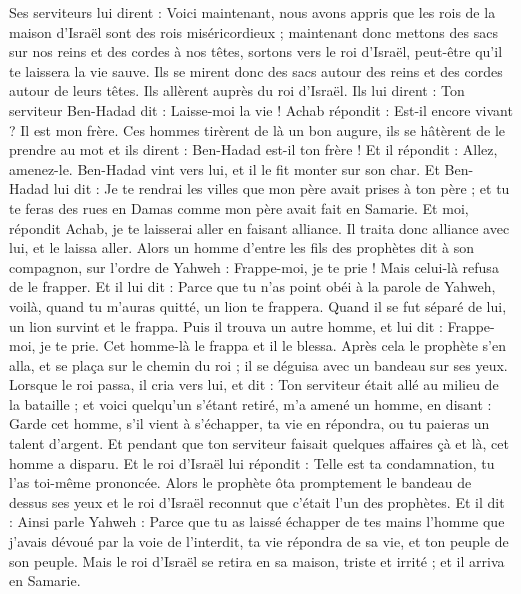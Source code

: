 \begin{multicols}{2}
Ses serviteurs lui dirent : Voici maintenant, nous avons appris que les rois de la maison d'Israël sont des rois miséricordieux ; maintenant donc mettons des sacs sur nos reins et des cordes à nos têtes, sortons vers le roi d'Israël, peut-être qu'il te laissera la vie sauve.
Ils se mirent donc des sacs autour des reins et des cordes autour de leurs têtes. Ils allèrent auprès du roi d'Israël. Ils lui dirent : Ton serviteur Ben-Hadad dit : Laisse-moi la vie ! Achab répondit : Est-il encore vivant ? Il est mon frère.
Ces hommes tirèrent de là un bon augure, ils se hâtèrent de le prendre au mot et ils dirent : Ben-Hadad est-il ton frère ! Et il répondit : Allez, amenez-le. Ben-Hadad vint vers lui, et il le fit monter sur son char.
Et Ben-Hadad lui dit : Je te rendrai les villes que mon père avait prises à ton père ; et tu te feras des rues en Damas comme mon père avait fait en Samarie. Et moi, répondit Achab, je te laisserai aller en faisant alliance. Il traita donc alliance avec lui, et le laissa aller.
Alors un homme d'entre les fils des prophètes dit à son compagnon, sur l’ordre de Yahweh : Frappe-moi, je te prie ! Mais celui-là refusa de le frapper.
Et il lui dit : Parce que tu n'as point obéi à la parole de Yahweh, voilà, quand tu m’auras quitté, un lion te frappera. Quand il se fut séparé de lui, un lion survint et le frappa.
Puis il trouva un autre homme, et lui dit : Frappe-moi, je te prie. Cet homme-là le frappa et il le blessa.
Après cela le prophète s'en alla, et se plaça sur le chemin du roi ; il se déguisa avec un bandeau sur ses yeux.
Lorsque le roi passa, il cria vers lui, et dit : Ton serviteur était allé au milieu de la bataille ; et voici quelqu'un s'étant retiré, m'a amené un homme, en disant : Garde cet homme, s'il vient à s'échapper, ta vie en répondra, ou tu paieras un talent d'argent.
Et pendant que ton serviteur faisait quelques affaires çà et là, cet homme a disparu. Et le roi d'Israël lui répondit : Telle est ta condamnation, tu l’as toi-même prononcée.
Alors le prophète ôta promptement le bandeau de dessus ses yeux et le roi d'Israël reconnut que c'était l’un des prophètes.
Et il dit : Ainsi parle Yahweh : Parce que tu as laissé échapper de tes mains l'homme que j'avais dévoué par la voie de l'interdit, ta vie répondra de sa vie, et ton peuple de son peuple.
Mais le roi d'Israël se retira en sa maison, triste et irrité ; et il arriva en Samarie.

\end{multicols}
